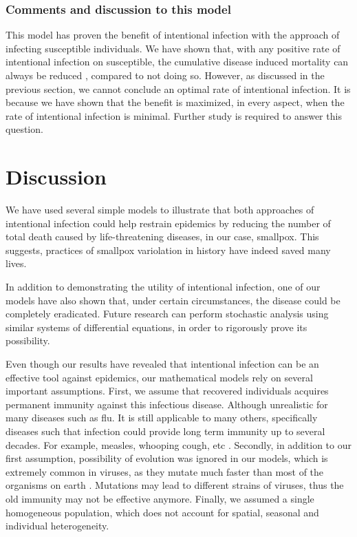 \documentclass[12pt]{article}
\begin{document}
\subsubsection{Comments and discussion to this model}
This model has proven the benefit of intentional infection with the approach of infecting susceptible individuals. We have shown that, with any positive rate of intentional infection on susceptible, the cumulative disease induced mortality can always be reduced , compared to not doing so. However, as discussed in the previous section, we cannot conclude an optimal rate of intentional infection. It is because we have shown that the benefit is maximized, in every aspect, when the rate of intentional infection is minimal. Further study is required to answer this question.
\section{Discussion}
We have used several simple models to illustrate that both approaches of intentional infection could help restrain epidemics by reducing the number of total death caused by life-threatening diseases, in our case, smallpox. This suggests, practices of smallpox variolation in history have indeed saved many lives. 

In addition to demonstrating the utility of intentional infection, one of our models have also shown that, under certain circumstances, the disease could be completely eradicated. Future research can perform stochastic analysis using similar systems of differential equations, in order to rigorously prove its possibility.

Even though our results have revealed that intentional infection can be an effective tool against epidemics, our mathematical models rely on several important assumptions. First, we assume that recovered individuals acquires permanent immunity against this infectious disease. Although unrealistic for many diseases such as flu. It is still applicable to many others, specifically diseases such that infection could provide long term immunity up to several decades. For example, measles, whooping cough, etc \cite{amanna2007duration}. Secondly, in addition to our first assumption, possibility of evolution was ignored in our models, which is extremely common in viruses, as they mutate much faster than most of the organisms on earth \cite{purcell2000hepatitis}. Mutations may lead to different strains of viruses, thus the old immunity may not be effective anymore. Finally, we assumed a single homogeneous population, which does not account for spatial, seasonal and individual heterogeneity.
\end{document}
